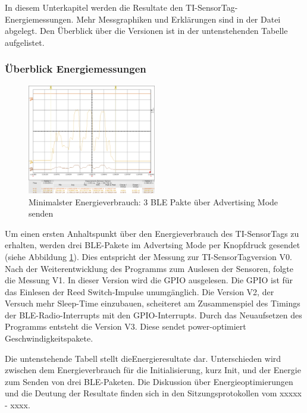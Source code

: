 In diesem Unterkapitel werden die Resultate den TI-SensorTag-Energiemessungen. Mehr Messgraphiken und Erklärungen sind in der Datei  abgelegt. Den Überblick über die Versionen ist in der untenstehenden Tabelle aufgelistet. 


\subsubsection{Überblick Energiemessungen}
\label{erst_EMessungen}

\begin{figure}[ht]
    \includegraphics[width=0.5\textwidth]{3Vorgehen/imag/v0Send33uJ.png} 
    \caption{Minimalster Energieverbrauch: 3 BLE Pakte über Advertising Mode senden}
    \label{BLE_send}
\end{figure}

Um einen ersten Anhaltspunkt über den Energieverbrauch des TI-SensorTags zu erhalten, werden drei BLE-Pakete im Advertsing Mode per Knopfdruck gesendet (siehe Abbildung \ref{BLE_send}). Dies entspricht der Messung zur TI-SensorTagversion V0. Nach der Weiterentwicklung des Programms zum Auslesen der Sensoren, folgte die Messung V1. In dieser Version wird die GPIO ausgelesen. Die GPIO ist für das Einlesen der Reed Switch-Impulse unumgänglich. Die Version V2, der Versuch mehr Sleep-Time einzubauen, scheiteret am Zusammenspiel des Timings der BLE-Radio-Interrupts mit den GPIO-Interrupts. Durch das Neuaufsetzen des Programms entsteht die Version V3. Diese sendet power-optimiert Geschwindigkeitspakete. 

Die untenstehende Tabell stellt dieEnergieresultate dar. Unterschieden wird zwischen dem Energieverbrauch für die Initialisierung, kurz Init, und der Energie zum Senden von drei BLE-Paketen. Die Diskussion über Energieoptimierungen und die Deutung der Resultate finden sich in den Sitzungsprotokollen vom xxxxx - xxxx. 


